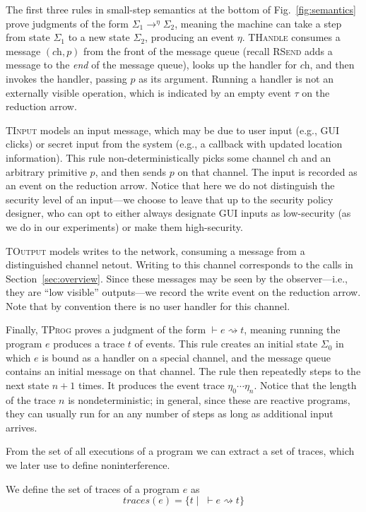 \documentclass[10pt,conference,compsocconf]{IEEEtran}
\newcommand{\code}[1]{\text{\lstinline!#1!}}
\newcommand{\aset}[1]{\{#1\}}
\newcommand{\sfmt}[1]{\textsf{#1}}
\newcommand{\sch}{\textit{ch}}
\newcommand{\treduce}{\rightarrow}
\newcommand{\judge}{\vdash}
\newcommand{\xv}{p}
\newcommand{\traces}{\textit{traces}}
\newcommand{\evt}{\eta}
\begin{document}
The first three rules 
in small-step semantics at the bottom of
Fig.~\ref{fig:semantics} prove judgments of the form
$\Sigma_1 \treduce^{\evt} \Sigma_2$, meaning the machine can take a step from state
$\Sigma_1$ to a new state $\Sigma_2$, producing an event $\evt$.
\textsc{THandle} consumes a message $(\sch, \xv)$ from the front of
the message queue (recall \textsc{RSend} adds a message to the
\emph{end}  of the message queue), looks up the handler for $\sch$,
and then invokes the handler, passing $\xv$ as its argument. Running a
handler is not an externally visible operation, which is indicated by an empty
event $\tau$ on the reduction arrow. 

\textsc{TInput} models an input message, which may be due to user
input (e.g., GUI clicks) or secret input from the system (e.g.,
a callback with updated location information). This rule
non-deterministically picks some channel $\sch$ and an arbitrary
primitive $p$, and then sends $p$ on that channel. 
The input is recorded as an event on the reduction arrow.
Notice that here we do not distinguish the security level of an input---we choose to leave that
up to the security policy designer, who can opt to either always
designate GUI inputs as low-security (as we do in our experiments) or
make them high-security.

\textsc{TOutput} models writes to the network, consuming a message
from a distinguished channel \sfmt{netout}. Writing to this channel
corresponds to the \code{InfoSender.sendInt} calls in
Section~\ref{sec:overview}. Since these messages may be seen by the
observer---i.e., they are ``low visible'' outputs---we record the
write event on the reduction arrow. Note that by convention
there is no user handler for this channel.

Finally, \textsc{TProg} proves a judgment of the form
$\judge e \rightsquigarrow t$, meaning running the program $e$ produces a
trace $t$ of events.
This rule creates an initial state $\Sigma_0$ in
which $e$ is bound as a handler on a special \code{onCreate} channel,
and the message queue contains an initial message on that channel. The
rule then repeatedly steps to the next state $n+1$ times. It produces 
the event trace $\eta_0\cdots\eta_n$.
Notice that the length of the trace $n$ is nondeterministic; in general,
since these are reactive programs, they can usually run for an any
number of steps as long as additional input arrives.

From the set of all executions of a program we can extract a set of
traces, which we later use to define noninterference.
\begin{definition}
  We define the set of traces of a program $e$ as
\begin{displaymath}
   \traces(e) = \aset{t \mid \; \judge e { \rightsquigarrow t }}
\end{displaymath}
\end{definition}
\end{document}
